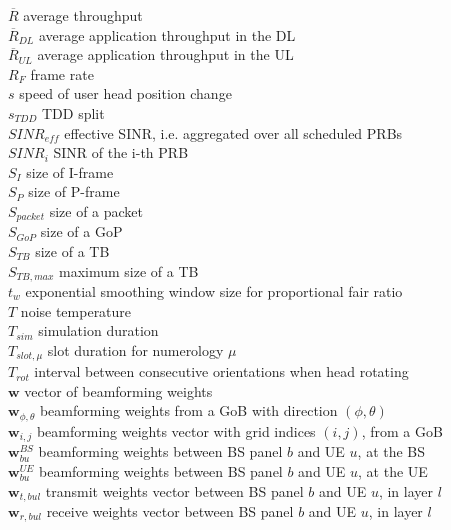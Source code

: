 $\overline{R}$ \mytab average throughput \\
$\overline{R}_{DL}$ \mytab average application throughput in the \acs{DL}\\
$\overline{R}_{UL}$ \mytab average application throughput in the \acs{UL}\\
$R_F$ \mytab frame rate \\
$s$ \mytab speed of user head position change \\
$s_{TDD}$ \mytab \acs{TDD} split \\
$SINR_{eff}$ \mytab effective \acs{SINR}, i.e. aggregated over all scheduled PRBs \\
$SINR_i$ \mytab SINR of the i-th \acs{PRB} \\
$S_I$ \mytab size of I-frame\\
$S_P$ \mytab size of P-frame\\
$S_{packet}$ \mytab size of a packet\\
$S_{GoP}$ \mytab size of a \acs{GoP}\\
$S_{TB}$ \mytab size of a \acs{TB}\\
$S_{TB, max}$ \mytab maximum size of a \acs{TB}\\
$t_w$ \mytab exponential smoothing window size for proportional fair ratio \\
$T$ \mytab noise temperature\\
$T_{sim}$ \mytab simulation duration\\
$T_{slot, \mu}$ \mytab slot duration for numerology $\mu$\\
$T_{rot}$ \mytab interval between consecutive orientations when head rotating\\
$\bm{w}$ \mytab vector of beamforming weights \\
$\bm{w}_{\phi, \theta}$ \mytab beamforming weights from a GoB with direction $(\phi, \theta)$ \\
$\bm{w}_{i,j}$ \mytab beamforming weights vector with grid indices $(i,j)$, from a GoB\\
$\bm{w}^{BS}_{bu}$ \mytab beamforming weights between BS panel $b$ and UE $u$, at the BS \\
$\bm{w}^{UE}_{bu}$ \mytab beamforming weights between BS panel $b$ and UE $u$, at the UE \\
$\bm{w}_{t, bul}$ \mytab transmit weights vector between BS panel $b$ and UE $u$, in layer $l$\\
$\bm{w}_{r, bul}$ \mytab receive weights vector between BS panel $b$ and UE $u$, in layer $l$\\

